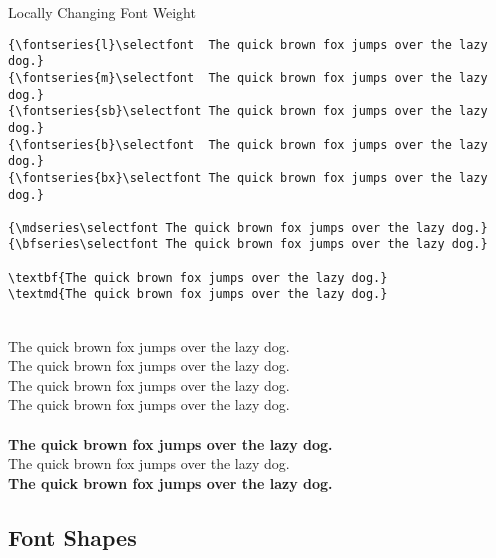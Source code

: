 \documentclass[a4paper,oneside,11pt]{article}
\begin{document}
\begin{titled-frame}
{\textsf{Locally Changing Font Weight}}
\vspace{-1em}
\begin{verbatim}
{\fontseries{l}\selectfont  The quick brown fox jumps over the lazy dog.}
{\fontseries{m}\selectfont  The quick brown fox jumps over the lazy dog.}
{\fontseries{sb}\selectfont The quick brown fox jumps over the lazy dog.}
{\fontseries{b}\selectfont  The quick brown fox jumps over the lazy dog.}
{\fontseries{bx}\selectfont The quick brown fox jumps over the lazy dog.}

{\mdseries\selectfont The quick brown fox jumps over the lazy dog.}
{\bfseries\selectfont The quick brown fox jumps over the lazy dog.}

\textbf{The quick brown fox jumps over the lazy dog.}
\textmd{The quick brown fox jumps over the lazy dog.}
\end{verbatim}

\\
{\selectfont  The quick brown fox jumps over the lazy dog.}\\
{\selectfont  The quick brown fox jumps over the lazy dog.}\\
{\selectfont  The quick brown fox jumps over the lazy dog.}\\
{\selectfont The quick brown fox jumps over the lazy dog.}\\

\\
{\bfseries\selectfont The quick brown fox jumps over the lazy dog.}\\

\noindent\textmd{The quick brown fox jumps over the lazy dog.}\\
\textbf{The quick brown fox jumps over the lazy dog.}\\
\vspace{-1em}
\end{titled-frame}


\subsection{Font Shapes}
\label{subsec:font-shapes}
\end{document}
